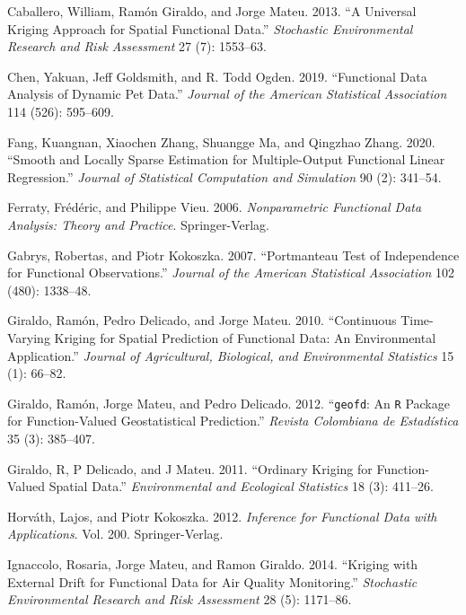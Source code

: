 \documentclass[
  12pt,
]{article}
\theoremstyle{definition}
\theoremstyle{definition}
\theoremstyle{definition}
\theoremstyle{remark}
\begin{document}
\leavevmode\hypertarget{ref-caballero2013universal}{}%
Caballero, William, Ramón Giraldo, and Jorge Mateu. 2013. ``A Universal Kriging Approach for Spatial Functional Data.'' \emph{Stochastic Environmental Research and Risk Assessment} 27 (7): 1553--63.

\leavevmode\hypertarget{ref-chen2018}{}%
Chen, Yakuan, Jeff Goldsmith, and R. Todd Ogden. 2019. ``Functional Data Analysis of Dynamic Pet Data.'' \emph{Journal of the American Statistical Association} 114 (526): 595--609.

\leavevmode\hypertarget{ref-kuangman2020}{}%
Fang, Kuangnan, Xiaochen Zhang, Shuangge Ma, and Qingzhao Zhang. 2020. ``Smooth and Locally Sparse Estimation for Multiple-Output Functional Linear Regression.'' \emph{Journal of Statistical Computation and Simulation} 90 (2): 341--54.

\leavevmode\hypertarget{ref-ferraty2006nonparametric}{}%
Ferraty, Frédéric, and Philippe Vieu. 2006. \emph{Nonparametric Functional Data Analysis: Theory and Practice}. Springer-Verlag.

\leavevmode\hypertarget{ref-gabrys2007portmanteau}{}%
Gabrys, Robertas, and Piotr Kokoszka. 2007. ``Portmanteau Test of Independence for Functional Observations.'' \emph{Journal of the American Statistical Association} 102 (480): 1338--48.

\leavevmode\hypertarget{ref-giraldo2010continuous}{}%
Giraldo, Ramón, Pedro Delicado, and Jorge Mateu. 2010. ``Continuous Time-Varying Kriging for Spatial Prediction of Functional Data: An Environmental Application.'' \emph{Journal of Agricultural, Biological, and Environmental Statistics} 15 (1): 66--82.

\leavevmode\hypertarget{ref-giraldo2012geofd}{}%
Giraldo, Ramón, Jorge Mateu, and Pedro Delicado. 2012. ``\texttt{geofd}: An \texttt{R} Package for Function-Valued Geostatistical Prediction.'' \emph{Revista Colombiana de Estadística} 35 (3): 385--407.

\leavevmode\hypertarget{ref-giraldo2011ordinary}{}%
Giraldo, R, P Delicado, and J Mateu. 2011. ``Ordinary Kriging for Function-Valued Spatial Data.'' \emph{Environmental and Ecological Statistics} 18 (3): 411--26.

\leavevmode\hypertarget{ref-horvath2012inference}{}%
Horváth, Lajos, and Piotr Kokoszka. 2012. \emph{Inference for Functional Data with Applications}. Vol. 200. Springer-Verlag.

\leavevmode\hypertarget{ref-ignaccolo2014kriging}{}%
Ignaccolo, Rosaria, Jorge Mateu, and Ramon Giraldo. 2014. ``Kriging with External Drift for Functional Data for Air Quality Monitoring.'' \emph{Stochastic Environmental Research and Risk Assessment} 28 (5): 1171--86.
\end{document}
